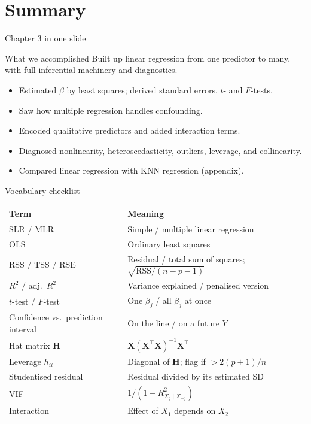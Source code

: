 \documentclass[aspectratio=169,11pt]{beamer}
\begin{document}
\section{Summary}

\begin{frame}{Chapter 3 in one slide}
  \begin{block}{What we accomplished}
    Built up linear regression from one predictor to many, with full
    inferential machinery and diagnostics.
  \end{block}
  \begin{itemize}
    \item Estimated $\beta$ by least squares; derived standard errors,
          $t$- and $F$-tests.
    \item Saw how multiple regression handles confounding.
    \item Encoded qualitative predictors and added interaction terms.
    \item Diagnosed nonlinearity, heteroscedasticity, outliers,
          leverage, and collinearity.
    \item Compared linear regression with KNN regression (appendix).
  \end{itemize}
\end{frame}

\begin{frame}{Vocabulary checklist}
  \footnotesize
  \begin{tabular}{ll}
    \toprule
    \textbf{Term} & \textbf{Meaning} \\
    \midrule
    SLR / MLR & Simple / multiple linear regression \\
    OLS & Ordinary least squares \\
    RSS / TSS / RSE & Residual / total sum of squares; $\sqrt{\mathrm{RSS}/(n-p-1)}$ \\
    $R^2$ / adj.\ $R^2$ & Variance explained / penalised version \\
    $t$-test / $F$-test & One $\beta_j$ / all $\beta_j$ at once \\
    Confidence vs.\ prediction interval & On the line / on a future $Y$ \\
    Hat matrix $\mathbf{H}$ & $\mathbf{X}(\mathbf{X}^\top\mathbf{X})^{-1}\mathbf{X}^\top$ \\
    Leverage $h_{ii}$ & Diagonal of $\mathbf{H}$; flag if $> 2(p+1)/n$ \\
    Studentised residual & Residual divided by its estimated SD \\
    VIF & $1/(1 - R^2_{X_j \mid X_{-j}})$ \\
    Interaction & Effect of $X_1$ depends on $X_2$ \\
    \bottomrule
  \end{tabular}
\end{frame}
\end{document}
